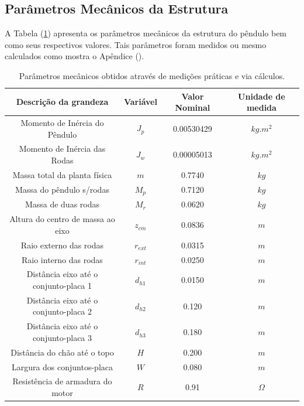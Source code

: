 \subsection{Parâmetros Mecânicos da Estrutura}

A Tabela (\ref{tab:ParametroEstrutura}) apresenta os parâmetros mecânicos da estrutura do pêndulo bem como seus respectivos valores. Tais parâmetros foram medidos ou mesmo calculados como mostra o Apêndice ().
\begin{table}[!htb]
\centering
\caption{Parâmetros mecânicos obtidos através de medições práticas e via cálculos.}
\label{tab:ParametroEstrutura}
\begin{tabular}{@{}cccc@{}}
\toprule
\textbf{Descrição da grandeza} & \multicolumn{1}{l}{\textbf{Variável}} & \textbf{Valor Nominal} & \textbf{Unidade de medida} \\ \midrule
Momento de Inércia do Pêndulo           & $J_p$         & 0.00530429    & $kg.m^2$    \\
Momento de Inércia das Rodas            & $J_w$         & 0.00005013    & $kg.m^2$    \\
Massa total da planta física            & $m$           & 0.7740        & $kg$      \\
Massa do pêndulo s/rodas                & $M_{p}$       & 0.7120        & $kg$      \\
Massa de duas rodas                     & $M_{r}$       & 0.0620        & $kg$      \\
Altura do centro de massa ao eixo    & $z_{cm}$      & 0.0836        & $m$         \\
Raio externo das rodas                  & $r_{ext}$     & 0.0315        & $m$         \\
Raio interno das rodas                  & $r_{int}$     & 0.0250        & $m$         \\
Distância eixo até o conjunto-placa 1   & $d_{h1}$      & 0.0150        & $m$       \\
Distância eixo até o conjunto-placa 2   & $d_{h2}$      & 0.120         & $m$       \\
Distância eixo até o conjunto-placa 3   & $d_{h3}$      & 0.180         & $m$       \\
Distância do chão até o topo            & $H$           & 0.200         & $m$       \\
Largura dos conjuntos-placa             & $W$           & 0.080         & $m$       \\
Resistência de armadura do motor        & $R$           & 0.91          & $\Omega$  \\
\bottomrule
\end{tabular}
\end{table}

